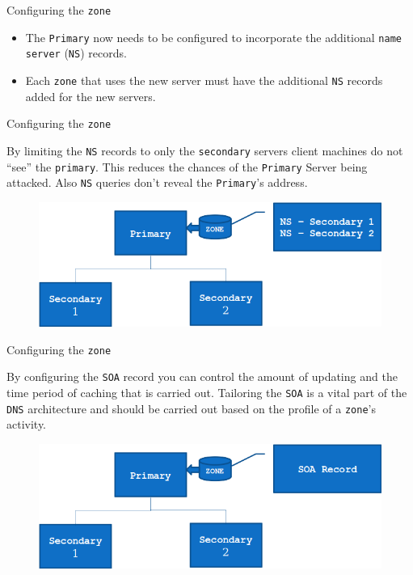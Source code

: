 \documentclass[xcolor=table]{beamer}
\begin{document}
\begin{frame}{Configuring the \texttt{zone}}
  \begin{itemize}
    \item The \texttt{Primary} now needs to be configured to incorporate the additional \texttt{name server} (\texttt{NS}) records.
    \item Each \texttt{zone} that uses the new server must have the additional \texttt{NS} records added for the new servers.
  \end{itemize}
\end{frame}

\begin{frame}{Configuring the \texttt{zone}}
  \begin{tcolorbox}[title={\textbf{SECURITY:}}]
      By limiting the \texttt{NS} records to only the \texttt{secondary} servers client machines do not ``see'' the \texttt{primary}. This reduces the chances of the \texttt{Primary} Server being attacked. Also \texttt{NS} queries don't reveal the \texttt{Primary}'s address.
  \end{tcolorbox}
  \begin{figure}
    \begin{center}
      \includegraphics[width=.7\linewidth]{Secondary.png}
    \end{center}
  \end{figure}
\end{frame}

\begin{frame}{Configuring the \texttt{zone}}
  \begin{tcolorbox}[title={\textbf{PERFORMANCE:}}]
    By configuring the \texttt{SOA} record you can control the amount of updating and the time period of caching that is carried out. Tailoring the \texttt{SOA} is a vital part of the \texttt{DNS} architecture and should be carried out based on the profile of a \texttt{zone}'s activity.
  \end{tcolorbox}
  \begin{figure}
    \begin{center}
      \includegraphics[width=.7\linewidth]{Secondary2.png}
    \end{center}
  \end{figure}
\end{frame}
\end{document}
